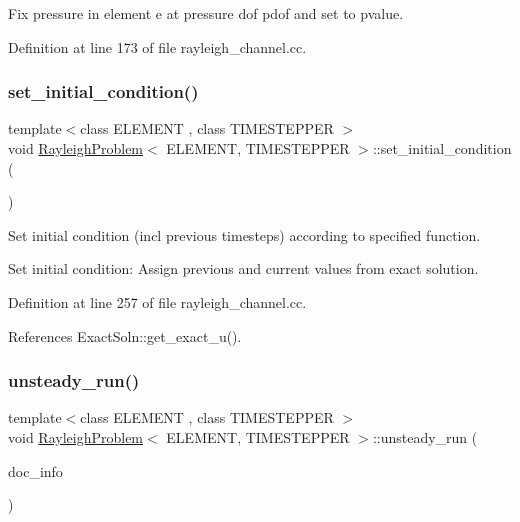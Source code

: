Fix pressure in element e at pressure dof pdof and set to pvalue. 



Definition at line 173 of file rayleigh\+\_\+channel.\+cc.

\mbox{\label{classRayleighProblem_a5c54c02c45c656cabbe8f8808e2cfd6b}} 
\subsubsection{\texorpdfstring{set\+\_\+initial\+\_\+condition()}{set\_initial\_condition()}}
{\footnotesize\ttfamily template$<$class E\+L\+E\+M\+E\+NT , class T\+I\+M\+E\+S\+T\+E\+P\+P\+ER $>$ \\
void \hyperlink{classRayleighProblem}{Rayleigh\+Problem}$<$ E\+L\+E\+M\+E\+NT, T\+I\+M\+E\+S\+T\+E\+P\+P\+ER $>$\+::set\+\_\+initial\+\_\+condition (\begin{DoxyParamCaption}{ }\end{DoxyParamCaption})}



Set initial condition (incl previous timesteps) according to specified function. 

Set initial condition\+: Assign previous and current values from exact solution. 

Definition at line 257 of file rayleigh\+\_\+channel.\+cc.



References Exact\+Soln\+::get\+\_\+exact\+\_\+u().

\mbox{\label{classRayleighProblem_a7404085b8be8865ffc07fd4133e40151}} 
\subsubsection{\texorpdfstring{unsteady\+\_\+run()}{unsteady\_run()}}
{\footnotesize\ttfamily template$<$class E\+L\+E\+M\+E\+NT , class T\+I\+M\+E\+S\+T\+E\+P\+P\+ER $>$ \\
void \hyperlink{classRayleighProblem}{Rayleigh\+Problem}$<$ E\+L\+E\+M\+E\+NT, T\+I\+M\+E\+S\+T\+E\+P\+P\+ER $>$\+::unsteady\+\_\+run (\begin{DoxyParamCaption}\item[{Doc\+Info \&}]{doc\+\_\+info }\end{DoxyParamCaption})}



